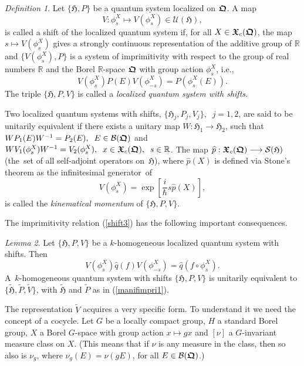 \documentclass[12pt]{amsart}
\numberwithin{equation}{section}
\theoremstyle{remark}
\newcommand\HH{\mathfrak H}
\newtheorem{defi}{Definition}[section]
\newtheorem{lem}[defi]{Lemma}
\newcommand{\bedefin}{\begin{defi}}
\newcommand{\belem}{\begin{lem}}
\newcommand{\enlem}{\end{lem}}
\newcommand{\be}{\begin{equation}}
\newcommand{\en}{\end{equation}}
\newcommand{\htil}{\widetilde{\mathfrak H}}
\newcommand{\bfrakQ}{\mbox{\boldmath $\mathfrak Q$}}
\newcommand{\bfrakX}{\mbox{\boldmath $\mathfrak X$}}
\begin{document}
\bedefin
  Let $\{\HH ,P\}$ be a quantum system localized on $\bfrakQ$. A map
\be
   V: \phi^X_s \longmapsto  V( \phi^X_s ) \in {\mathcal U}(\HH ),
\label{shift2}
\en
is called a shift of the localized quantum system if, for all
$X \in {\bfrakX}_c (\bfrakQ )$, the map $s \longmapsto V( \phi^X_s )$ gives a
strongly continuous representation of the additive group of $\mathbb R$ and
$\{V( \phi^X_s ) , P \}$ is a system of imprimitivity with respect to the group
of real numbers $\mathbb R$ and the Borel $\mathbb R$-space $\bfrakQ$ with
group action $\phi^X_s$, i.e.,
\be
   V( \phi^X_s )P(E)V( \phi^X_{-s} ) = P(\phi^X_s (E)).
\label{shift3}
\en
The triple $\{ \HH , P , V \}$ is called a {\it localized quantum system with
shifts.}  \end{defi}

Two localized quantum systems with shifts, $\{ \HH_j , P_j , V_j \}, \;\;
j=1,2$, are said to be unitarily equivalent if there exists a unitary map $W:
\HH_1 \longrightarrow \HH_2$, such that $W P_1 (E)W^{-1} = P_2 (E), \;\; E \in
{\mathcal B}(\bfrakQ )$ and $WV_1(\phi^X_s )W^{-1} = V_2(\phi^X_s ), \;\; x \in
{\bfrakX}_c (\bfrakQ ), \;\; s \in \mathbb R$. The map $\widehat{p} :
{\bfrakX}_c (\bfrakQ ) \longrightarrow  {\mathcal S}(\HH )$
(the~set of all self-adjoint operators on~$\HH$), where $\widehat{p}(X)$ is
defined via Stone's theorem as the infinitesimal generator~of
\be
     V( \phi^X_s ) = \exp [\frac i\hbar s\widehat{p}(X) ],
\label{kinmom}
\en
is called the {\em kinematical momentum} of $\{ \HH , P, V\}$.

The imprimitivity relation (\ref{shift3}) has the following important
consequences.

\belem
Let $\{ \HH , P , V \}$ be a $k$-homogeneous localized quantum system with
shifts. Then
\be
 V( \phi^X_s )\widehat{q}(f)V( \phi^X_{-s} ) = \widehat{q}(f\circ\phi^X_s).
\label{shift4}
\en
A~$k$-homogeneous quantum system with shifts $\{ \HH , P , V \}$ is unitarily
equivalent to $\{ \htil , \widetilde{P} , \widetilde{V} \}$, with $\htil$ and
$\widetilde{P}$ as in (\ref{manifimpri1}).
\enlem

The representation $\widetilde{V}$ acquires a very specific form. To understand
it we need the concept of a cocycle. Let $G$ be a locally compact group, $H$ a
standard Borel group, $X$ a Borel $G$-space with group action $x\longmapsto gx$
and $[\nu]$ a $G$-invariant measure class on $X$. (This means that if $\nu$ is
any measure in the class, then so also is $\nu_g$, where $\nu_g(E)=\nu(gE)$,
for all $E \in {\mathcal B}(\bfrakQ )$.)
\end{document}
